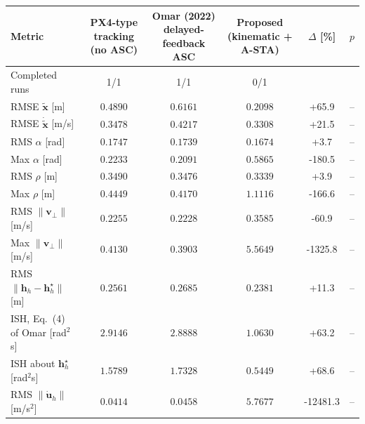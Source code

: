 
\begin{tabular}{lccccc}
\toprule
Metric & PX4-type tracking (no ASC) & Omar (2022) delayed-feedback ASC & Proposed (kinematic + A-STA) & $\Delta$ [\%] & $p$ \\
\midrule
Completed runs & 1/1 & 1/1 & 0/1 & & \\
RMSE $\tilde{\mathbf{x}}$ [m] & $0.4890$ & $0.6161$ & $0.2098$ & +65.9 & -- \\
RMSE $\dot{\tilde{\mathbf{x}}}$ [m/s] & $0.3478$ & $0.4217$ & $0.3308$ & +21.5 & -- \\
RMS $\alpha$ [rad] & $0.1747$ & $0.1739$ & $0.1674$ & +3.7 & -- \\
Max $\alpha$ [rad] & $0.2233$ & $0.2091$ & $0.5865$ & -180.5 & -- \\
RMS $\rho$ [m] & $0.3490$ & $0.3476$ & $0.3339$ & +3.9 & -- \\
Max $\rho$ [m] & $0.4449$ & $0.4170$ & $1.1116$ & -166.6 & -- \\
RMS $\|\mathbf{v}_\perp\|$ [m/s] & $0.2255$ & $0.2228$ & $0.3585$ & -60.9 & -- \\
Max $\|\mathbf{v}_\perp\|$ [m/s] & $0.4130$ & $0.3903$ & $5.5649$ & -1325.8 & -- \\
RMS $\|\mathbf{h}_h-\mathbf{h}^\star_h\|$ [m] & $0.2561$ & $0.2685$ & $0.2381$ & +11.3 & -- \\
ISH, Eq.~(4) of Omar [rad$^2$s] & $2.9146$ & $2.8888$ & $1.0630$ & +63.2 & -- \\
ISH about $\mathbf{h}^\star_h$ [rad$^2$s] & $1.5789$ & $1.7328$ & $0.5449$ & +68.6 & -- \\
RMS $\|\dot{\mathbf{u}}_h\|$ [m/s$^2$] & $0.0414$ & $0.0458$ & $5.7677$ & -12481.3 & -- \\
\bottomrule
\end{tabular}
